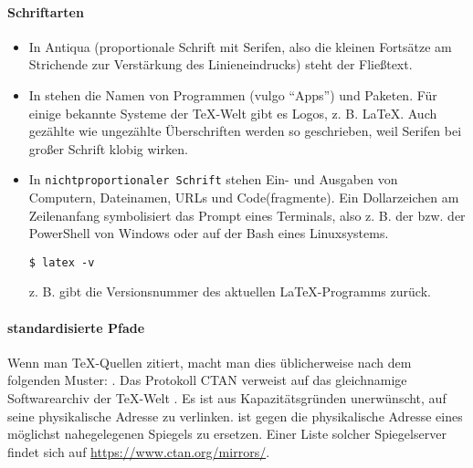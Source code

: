 \documentclass[12pt,table]{scrreprt}
\begin{document}
\paragraph{Schriftarten}
\begin{itemize}
\item In Antiqua (proportionale Schrift mit Serifen, also die kleinen Fortsätze am Strichende zur Verstärkung des Linieneindrucks) steht der Fließtext.
\item In  stehen die Namen von Programmen (vulgo \enquote{Apps}) und Paketen. Für einige bekannte Systeme der \TeX-Welt gibt es Logos, z. B. \LaTeX. Auch gezählte wie ungezählte Überschriften werden so geschrieben, weil Serifen bei großer Schrift klobig wirken.
\item In \texttt{nichtproportionaler Schrift} stehen Ein- und Ausgaben von Computern, Dateinamen, URLs und Code(fragmente). Ein Dollarzeichen am Zeilenanfang symbolisiert das Prompt eines Terminals, also z. B.  der  bzw.  der PowerShell von Windows oder  auf der Bash eines Linuxsystems.
\begin{Verbatim}
$ latex -v
\end{Verbatim}
z. B. gibt die Versionsnummer des aktuellen \LaTeX-Programms zurück.
\end{itemize}

\paragraph{standardisierte Pfade}
Wenn man \TeX-Quellen zitiert, macht man dies üblicherweise nach dem folgenden Muster: . Das Protokoll CTAN verweist auf das gleichnamige Softwarearchiv der \TeX-Welt . Es ist aus Kapazitätsgründen unerwünscht, auf seine physikalische Adresse zu verlinken.  ist gegen die physikalische Adresse eines möglichst nahegelegenen Spiegels zu ersetzen. Einer Liste solcher Spiegelserver findet sich auf \url{https://www.ctan.org/mirrors/}.
\end{document}
